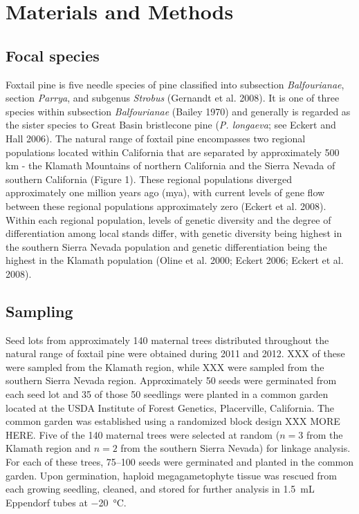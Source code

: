 \documentclass[11pt]{article}
\begin{document}
\section{Materials and Methods}

\subsection{Focal species}
Foxtail pine is five needle species of pine classified into 
subsection \textit{Balfourianae}, section \textit{Parrya}, and subgenus \textit{Strobus} 
(Gernandt et al. 2008). It is one of three species within subsection \textit{Balfourianae} 
(Bailey 1970) and generally is regarded as the sister species to Great Basin bristlecone pine (\textit{P. longaeva}; see 
Eckert and Hall 2006). The natural range of foxtail pine encompasses two 
regional populations located within California that are separated by approximately 500 km - 
the Klamath Mountains of northern California and the Sierra Nevada of southern California 
(Figure 1). These regional populations diverged approximately one million years ago (mya), 
with current levels of gene flow between these regional populations approximately zero 
(Eckert et al. 2008). Within each regional population, levels of genetic diversity and the 
degree of differentiation among local stands differ, with genetic diversity being highest in 
the southern Sierra Nevada population and genetic differentiation being the highest in the 
Klamath population (Oline et al. 2000; Eckert 2006; Eckert et al. 2008).

\subsection{Sampling}
Seed lots from approximately 140 maternal trees distributed throughout the natural range 
of foxtail pine were obtained during 2011 and 2012. XXX of these were sampled from the 
Klamath region, while XXX were sampled from the southern Sierra Nevada region. Approximately 
50 seeds were germinated from each seed lot and 35 of those 50 seedlings were planted in a 
common garden located at the USDA Institute of Forest Genetics, Placerville, California. The 
common garden was established using a randomized block design XXX MORE HERE. Five of the 
140 maternal trees were selected at random ($n = 3$ from the Klamath region and $n = 2$ from 
the southern Sierra Nevada) for linkage analysis. For each of these trees, \SIrange{75}{100}{} 
seeds were germinated and planted in the common garden. Upon germination, haploid 
megagametophyte tissue was rescued from each growing seedling, cleaned, and stored for further 
analysis in \SI{1.5}{\mL} Eppendorf tubes at \SI{-20}{\celsius}.
\end{document}
